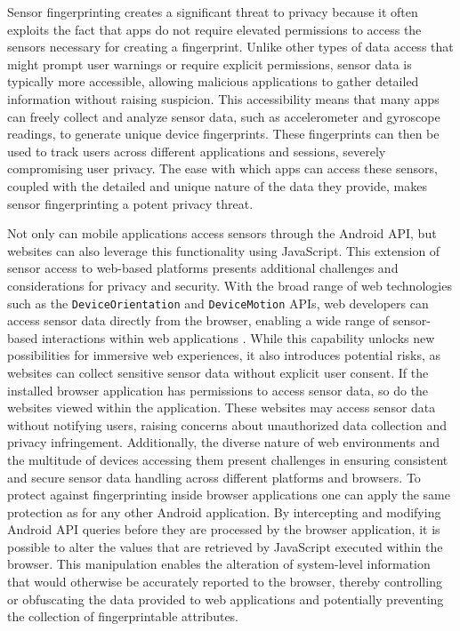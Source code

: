 \documentclass[11pt,
  oneside,openany,    %
]{scrreprt}
\begin{document}
Sensor fingerprinting creates a significant threat to privacy because it often exploits the fact that apps do not require elevated permissions to access the sensors necessary for creating a fingerprint.
Unlike other types of data access that might prompt user warnings or require explicit permissions, sensor data is typically more accessible, allowing malicious applications to gather detailed information without raising suspicion. 
This accessibility means that many apps can freely collect and analyze sensor data, such as accelerometer and gyroscope readings, to generate unique device fingerprints.
These fingerprints can then be used to track users across different applications and sessions, severely compromising user privacy.
The ease with which apps can access these sensors, coupled with the detailed and unique nature of the data they provide, makes sensor fingerprinting a potent privacy threat.

Not only can mobile applications access sensors through the Android API, but websites can also leverage this functionality using JavaScript.
This extension of sensor access to web-based platforms presents additional challenges and considerations for privacy and security.
With the broad range of web technologies such as the \verb|DeviceOrientation| and \verb|DeviceMotion| APIs, web developers can access sensor data directly from the browser, enabling a wide range of sensor-based interactions within web applications \cite{DBLP:journals/popets/DasBC18}.
While this capability unlocks new possibilities for immersive web experiences, it also introduces potential risks, as websites can collect sensitive sensor data without explicit user consent.
If the installed browser application has permissions to access sensor data, so do the websites viewed within the application.
These websites may access sensor data without notifying users, raising concerns about unauthorized data collection and privacy infringement.
Additionally, the diverse nature of web environments and the multitude of devices accessing them present challenges in ensuring consistent and secure sensor data handling across different platforms and browsers.
To protect against fingerprinting inside browser applications one can apply the same protection as for any other Android application.
By intercepting and modifying Android API queries before they are processed by the browser application, it is possible to alter the values that are retrieved by JavaScript executed within the browser.
This manipulation enables the alteration of system-level information that would otherwise be accurately reported to the browser, thereby controlling or obfuscating the data provided to web applications and potentially preventing the collection of fingerprintable attributes.
\end{document}
